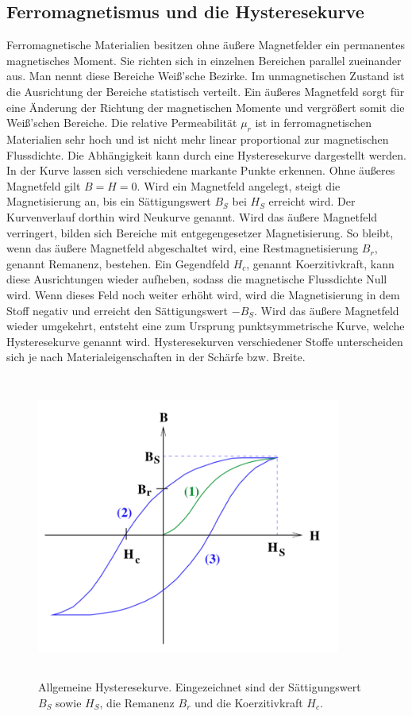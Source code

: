 \subsection{Ferromagnetismus und die Hysteresekurve}
Ferromagnetische Materialien besitzen ohne äußere Magnetfelder ein permanentes 
magnetisches Moment. Sie richten sich in einzelnen Bereichen parallel zueinander aus. 
Man nennt diese Bereiche Weiß'sche Bezirke. Im unmagnetischen Zustand ist die 
Ausrichtung der Bereiche statistisch verteilt. Ein äußeres Magnetfeld sorgt für eine 
Änderung der Richtung der magnetischen Momente und vergrößert somit die Weiß'schen 
Bereiche. 
\newline
Die relative Permeabilität $\mu_{r}$ ist in ferromagnetischen Materialien sehr hoch 
und ist nicht mehr linear proportional zur magnetischen Flussdichte. 
Die Abhängigkeit kann durch eine Hysteresekurve dargestellt werden.
In der Kurve lassen sich verschiedene markante Punkte erkennen. 
Ohne äußeres Magnetfeld gilt $B = H = 0$. Wird ein Magnetfeld angelegt, steigt die 
Magnetisierung an, bis ein Sättigungswert $B_{S}$ bei $H_{S}$ erreicht wird. Der 
Kurvenverlauf dorthin wird Neukurve genannt. 
Wird das äußere Magnetfeld verringert, bilden sich Bereiche mit entgegengesetzer 
Magnetisierung. So bleibt, wenn das äußere Magnetfeld abgeschaltet wird, eine 
Restmagnetisierung $B_{r}$, genannt Remanenz, bestehen. 
Ein Gegendfeld $H_{c}$, genannt Koerzitivkraft, kann diese Ausrichtungen wieder 
aufheben, sodass die magnetische Flussdichte Null wird. Wenn dieses Feld noch weiter 
erhöht wird, wird die Magnetisierung %
in dem Stoff negativ und erreicht den Sättigungswert $-B_{S}$. Wird das äußere 
Magnetfeld wieder umgekehrt, entsteht eine zum Ursprung punktsymmetrische Kurve, welche
Hysteresekurve genannt wird. Hysteresekurven verschiedener Stoffe unterscheiden sich je
nach Materialeigenschaften in der Schärfe bzw. Breite. 
\begin{figure}
    \centering
    \includegraphics[width=10cm,height=10cm]{build/Hysteresekurve.png}
    \caption{Allgemeine Hysteresekurve. Eingezeichnet sind der Sättigungswert $B_{S}$
    sowie $H_{S}$, die Remanenz $B_{r}$ und die Koerzitivkraft $H_{c}$.}
\end{figure}
